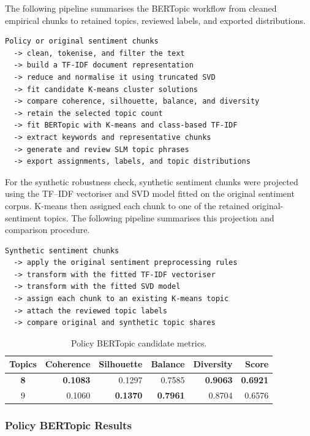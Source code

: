 The following pipeline summarises the BERTopic workflow from cleaned empirical
chunks to retained topics, reviewed labels, and exported distributions.

{\small
\begin{verbatim}
Policy or original sentiment chunks
  -> clean, tokenise, and filter the text
  -> build a TF-IDF document representation
  -> reduce and normalise it using truncated SVD
  -> fit candidate K-means cluster solutions
  -> compare coherence, silhouette, balance, and diversity
  -> retain the selected topic count
  -> fit BERTopic with K-means and class-based TF-IDF
  -> extract keywords and representative chunks
  -> generate and review SLM topic phrases
  -> export assignments, labels, and topic distributions
\end{verbatim}
}

For the synthetic robustness check, synthetic sentiment chunks were projected using
the TF--IDF vectoriser and SVD model fitted on the original sentiment corpus.
K-means then assigned each chunk to one of the retained original-sentiment topics.
The following pipeline summarises this projection and comparison procedure.

{\small
\begin{verbatim}
Synthetic sentiment chunks
  -> apply the original sentiment preprocessing rules
  -> transform with the fitted TF-IDF vectoriser
  -> transform with the fitted SVD model
  -> assign each chunk to an existing K-means topic
  -> attach the reviewed topic labels
  -> compare original and synthetic topic shares
\end{verbatim}
}

\begin{table}[ht]
\centering
\small
\setlength{\tabcolsep}{4pt}
\begin{tabular}{crrrrr}
\hline
Topics & Coherence & Silhouette & Balance & Diversity & Score \\
\hline
\textbf{8} & \textbf{0.1083} & 0.1297 & 0.7585 & \textbf{0.9063} &
\textbf{0.6921} \\
9 & 0.1060 & \textbf{0.1370} & \textbf{0.7961} & 0.8704 & 0.6576 \\
\hline
\end{tabular}
\caption{Policy BERTopic candidate metrics.}
\label{tab:impl-bertopic-policy-candidates}
\end{table}


\subsubsection*{Policy BERTopic Results}

